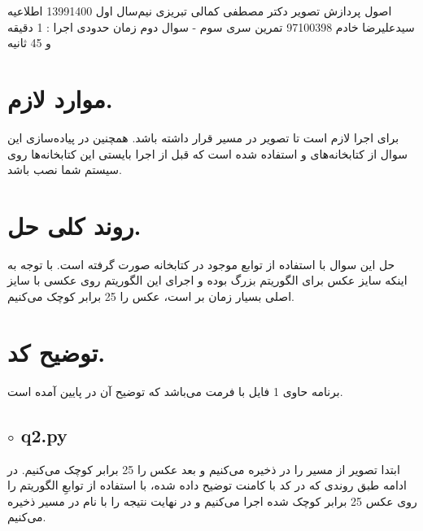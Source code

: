 \documentclass[a4paper,12pt]{article}
\begin{document}
	\handout
	{اصول پردازش تصویر}
	{دکتر مصطفی کمالی تبریزی}
	{نیم‌سال اول 1399\lr{-}1400}
	{اطلاعیه}
	{سیدعلیرضا خادم}
	{97100398}
	{تمرین سری سوم - سوال دوم}
	زمان حدودی اجرا : 1 دقیقه و 45 ثانیه
	\section*{موارد لازم.}
	برای اجرا لازم است تا تصویر
	در مسیر
	قرار داشته باشد. همچنین در پیاده‌سازی این سوال از کتابخانه‌های 
	و
	استفاده شده است که قبل از اجرا بایستی این کتابخانه‌ها روی سیستم شما نصب باشد.
	\section*{روند کلی حل.}
	حل این سوال با استفاده از توابع موجود در کتابخانه 
	صورت گرفته است. با توجه به اینکه سایز عکس برای الگوریتم 
	بزرگ بوده و اجرای این الگوریتم روی عکسی با سایز اصلی بسیار زمان بر است، عکس را 25 برابر کوچک می‌کنیم.
	
	
	\section*{توضیح کد.}
	برنامه حاوی 1 فایل با فرمت
	می‌باشد که توضیح آن در پایین آمده است.
	
	\subsection*{$\circ$ q2.py}
	ابتدا تصویر 
	از مسیر 
	را در 
	ذخیره می‌کنیم و بعد عکس را 25 برابر کوچک می‌کنیم. در ادامه طبق روندی که در کد با کامنت توضیح داده شده، با استفاده از توابعِ 
	الگوریتم را روی عکس 25 برابر کوچک شده اجرا می‌کنیم و در نهایت نتیجه را با نام 
	در مسیر 
	ذخیره می‌کنیم.
	
	
	
\end{document}
